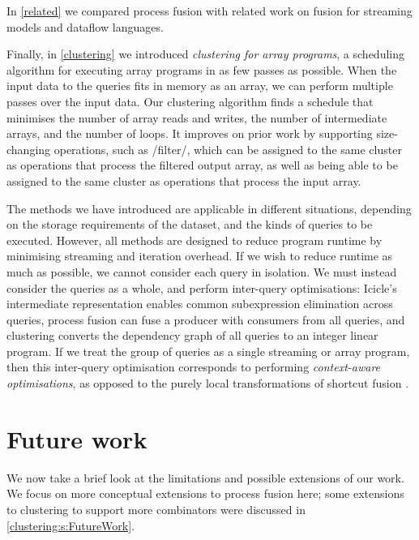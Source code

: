 In \cref{related} we compared process fusion with related work on fusion for streaming models and dataflow languages.

Finally, in \cref{clustering} we introduced \emph{clustering for array programs}, a scheduling algorithm for executing array programs in as few passes as possible.
When the input data to the queries fits in memory as an array, we can perform multiple passes over the input data.
Our clustering algorithm finds a schedule that minimises the number of array reads and writes, the number of intermediate arrays, and the number of loops.
It improves on prior work by supporting size-changing operations, such as \Hs/filter/, which can be assigned to the same cluster as operations that process the filtered output array, as well as being able to be assigned to the same cluster as operations that process the input array.

The methods we have introduced are applicable in different situations, depending on the storage requirements of the dataset, and the kinds of queries to be executed.
However, all methods are designed to reduce program runtime by minimising streaming and iteration overhead.
If we wish to reduce runtime as much as possible, we cannot consider each query in isolation.
We must instead consider the queries as a whole, and perform inter-query optimisations: Icicle's intermediate representation enables common subexpression elimination across queries, process fusion can fuse a producer with consumers from all queries, and clustering converts the dependency graph of all queries to an integer linear program.
If we treat the group of queries as a single streaming or array program, then this inter-query optimisation corresponds to performing \emph{context-aware optimisations}, as opposed to the purely local transformations of shortcut fusion \citep{gill1993short}.

\section{Future work}
\label{related/future}

We now take a brief look at the limitations and possible extensions of our work.
We focus on more conceptual extensions to process fusion here; some extensions to clustering to support more combinators were discussed in \cref{clustering:s:FutureWork}.

